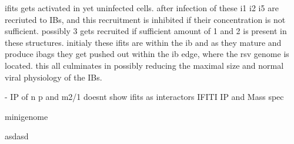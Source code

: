 ifits gets activated in yet uninfected cells. after infection of these i1 i2 i5 are recriuted to IBs, and this recruitment is inhibited if their concentration is not sufficient. possibly 3 gets recruited if sufficient amount of 1 and 2 is present in these structures. initialy these ifits are within the ib and as they mature and produce ibags they get pushed out within the ib edge, where the rsv genome is located. this all culminates in possibly reducing the maximal size and normal viral physiology of the IBs.

\cite{Oliveira2013HumanCells} - IP of n p and m2/1 doesnt show ifits as interactors
IFITI IP and Mass spec

minigenome \cite{Teng2016UseTranscription}


asdasd





